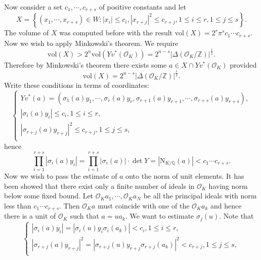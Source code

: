 Now consider a set $c_1,\cdots,c_{r+s}$ of positive constants and let 
$$
X=\left\{ \left( x_1,\cdots ,x_{r+s} \right) \in W:\left| x_i \right|\le c_i,\left| x_{r+j} \right|^2\le c_{r+j},1\le i\le r,1\le j\le s \right\} .
$$
The volume of $X$ was computed before with the result $\mathrm{vol}\left( X \right) =2^r\pi ^sc_1\cdots c_{r+s}$. Now we wish to apply Minkowski's theorem. We require 
$$
\mathrm{vol}\left( X \right) >2^n\mathrm{vol}\left( Yv^*\left( \mathcal{O} _K \right) \right) =2^{n-s}\left| \Delta \left( \mathcal{O} _K/\mathbb{Z} \right) \right|^{\frac{1}{2}}.
$$
Therefore by Minkowski's theorem there exists some $a\in X\cap Yv^*(\mathcal{O}_K)$ provided 
$$
\mathrm{vol}\left( X \right) =2^{n-s}\left| \Delta \left( \mathcal{O} _K/\mathbb{Z} \right) \right|^{\frac{1}{2}}.
$$
Write these conditions in terms of coordinates:
$$
\begin{cases}
	Yv^*\left( a \right) =\left( \sigma _1\left( a \right) y_1,\cdots ,\sigma _r\left( a \right) y_r,\sigma _{r+1}\left( a \right) y_{r+1},\cdots ,\sigma _{r+s}\left( a \right) y_{r+s} \right) ,\\
	\left| \sigma _i\left( a \right) y_i \right|\le c_i,1\le i\le r,\\
	\left| \sigma _{r+j}\left( a \right) y_{r+j} \right|^2\le c_{r+j},1\le j\le s,\\
\end{cases}
$$
hence 
$$
\prod_{i=1}^{r+s}{\left| \sigma _i\left( a \right) y_i \right|}=\prod_{i=1}^{r+s}{\left| \sigma _i\left( a \right) \right|}\cdot \det Y=\left| \mathrm{N}_{K/\mathbb{Q}}\left( a \right) \right|<c_1\cdots c_{r+s}.
$$
Now we wish to pass the estimate of $a$ onto the norm of unit elements. It has been showed that there exist only a finite number of ideals in $\mathcal{O}_K$ having norm below some fixed bound. Let $\mathcal{O}_Ka_1,\cdots,\mathcal{O}_Ka_N$ be all the principal ideals with norm less than $c_1\cdots c_{r+s}$. Then $\mathcal{O}_Ka$ must coincide with one of the $\mathcal{O}_Ka_k$ and hence there is a unit of $\mathcal{O}_K$ such that $a=ua_k$. We want to estimate $\sigma_j(u)$. Note that 
$$
\begin{cases}
	\left| \sigma _i\left( a \right) y_i \right|=\left| \sigma _i\left( u \right) y_i\sigma _i\left( a_k \right) \right|<c_i,1\le i\le r,\\
	\left| \sigma _{r+j}\left( a \right) y_{r+j} \right|^2=\left| \sigma _{r+j}\left( u \right) y_{r+j}\sigma _{r+j}\left( a_k \right) \right|^2<c_{r+j},1\le j\le s,\\
\end{cases}
$$
